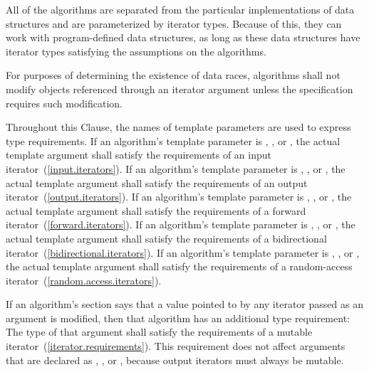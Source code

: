 \pnum
All of the algorithms are separated from the particular implementations of data structures and are
parameterized by iterator types.
Because of this, they can work with program-defined data structures, as long
as these data structures have iterator types satisfying the assumptions on the algorithms.

\pnum
For purposes of determining the existence of data races, algorithms shall
not modify objects referenced through an iterator argument unless the
specification requires such modification.


\begin{removedblock}
\pnum
Throughout this Clause, the names of template parameters
are used to express type requirements.
If an algorithm's template parameter is
,
,
or
,
the actual template argument shall satisfy the
requirements of an input iterator~(\ref{input.iterators}).
If an algorithm's template parameter is
,
,
or
,
the actual template argument shall satisfy the requirements
of an output iterator~(\ref{output.iterators}).
If an algorithm's template parameter is
,
,
or
,
the actual template argument shall satisfy the requirements
of a forward iterator~(\ref{forward.iterators}).
If an algorithm's template parameter is
,
,
or
,
the actual template argument shall satisfy the requirements
of a bidirectional iterator~(\ref{bidirectional.iterators}).
If an algorithm's template parameter is
,
,
or
,
the actual template argument shall satisfy the requirements
of a random-access iterator~(\ref{random.access.iterators}).

\pnum
If an algorithm's
section says that a value pointed to by any iterator passed
as an argument is modified, then that algorithm has an additional
type requirement:
The type of that argument shall satisfy the requirements
of a mutable iterator~(\ref{iterator.requirements}).
\enternote
This requirement does not affect arguments that are declared as
,
,
or
,
because output iterators must always be mutable.
\exitnote
\end{removedblock}


